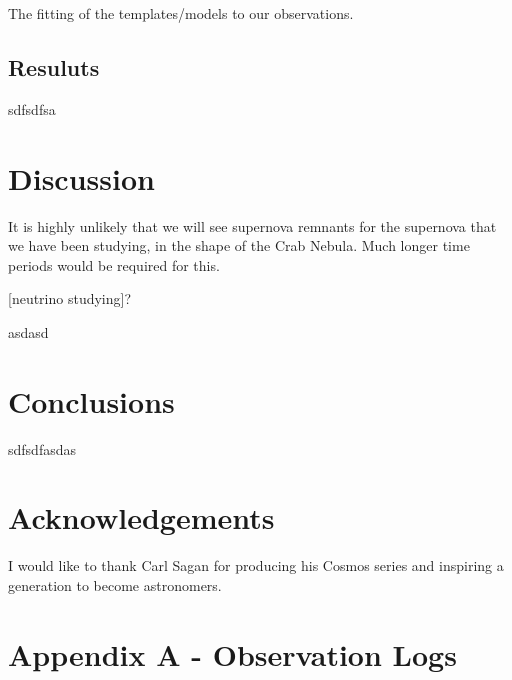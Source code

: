 \documentclass[twocolumn]{revtex4}
\begin{document}
The fitting of the templates/models to our observations.

\vspace{-3ex}
\subsection{Resuluts}
\vspace{-2ex}

sdfsdfsa

\vspace{-3ex}
\section{Discussion}
\vspace{-2ex}

It is highly unlikely that we will see supernova remnants for the supernova that we have been studying, in the shape of the Crab Nebula. Much longer time periods would be required for this. 

[neutrino studying]?

asdasd

\vspace{-5ex}
\section{Conclusions}
\vspace{-2ex}

sdfsdfasdas

\vspace{-5ex}
\section*{Acknowledgements}
\vspace{-2ex}

I would like to thank Carl Sagan for producing his Cosmos series and inspiring a generation to become astronomers.




\clearpage




\vfill
\twocolumngrid
\vspace{-3ex}
\section*{Appendix A - Observation Logs}
\vspace{-2ex}



\clearpage
\end{document}
